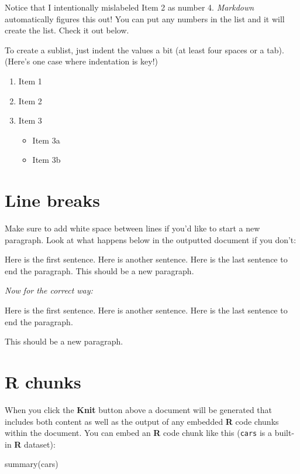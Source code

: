 \documentclass[print]{nuthesis}
\newenvironment{Shaded}{\begin{snugshade}}{\end{snugshade}}
\newcommand{\FunctionTok}[1]{\textcolor[rgb]{0.00,0.00,0.00}{#1}}
\newcommand{\NormalTok}[1]{#1}
\providecommand{\tightlist}{%
  \setlength{\itemsep}{0pt}\setlength{\parskip}{0pt}}
\begin{document}
Notice that I intentionally mislabeled Item 2 as number 4. \emph{Markdown} automatically figures this out! You can put any numbers in the list and it will create the list. Check it out below.

To create a sublist, just indent the values a bit (at least four spaces or a tab). (Here's one case where indentation is key!)

\begin{enumerate}
\def\labelenumi{\arabic{enumi}.}
\tightlist
\item
  Item 1
\item
  Item 2
\item
  Item 3

  \begin{itemize}
  \tightlist
  \item
    Item 3a
  \item
    Item 3b
  \end{itemize}
\end{enumerate}

\hypertarget{line-breaks}{%
\section{Line breaks}\label{line-breaks}}

Make sure to add white space between lines if you'd like to start a new paragraph. Look at what happens below in the outputted document if you don't:

Here is the first sentence. Here is another sentence. Here is the last sentence to end the paragraph.
This should be a new paragraph.

\emph{Now for the correct way:}

Here is the first sentence. Here is another sentence. Here is the last sentence to end the paragraph.

This should be a new paragraph.

\hypertarget{r-chunks}{%
\section{R chunks}\label{r-chunks}}

When you click the \textbf{Knit} button above a document will be generated that includes both content as well as the output of any embedded \textbf{R} code chunks within the document. You can embed an \textbf{R} code chunk like this (\texttt{cars} is a built-in \textbf{R} dataset):

\begin{Shaded}
\begin{Highlighting}[]
\FunctionTok{summary}\NormalTok{(cars)}
\end{Highlighting}
\end{Shaded}
\end{document}
